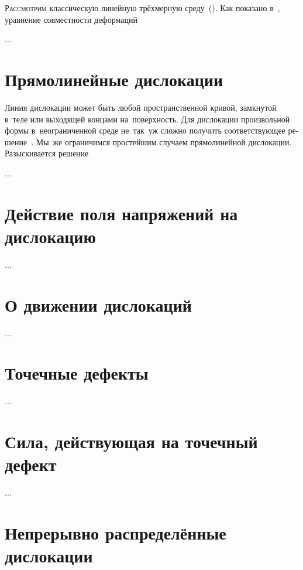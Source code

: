 \begin{otherlanguage}{russian}

\lettrine[lines=2, findent=2pt, nindent=0pt]{Р}{ассмотрим} классическую линейную трёхмерную среду~(). Как показано в~, уравнение совместности деформаций

...



\section{Прямолинейные дислокации}

Линия дислокации может быть любой пространственной кривой, замкнутой в~теле или выходящей концами на~поверхность. Для дислокации произвольной формы в~неограниченной среде не~так~уж сложно получить соответствующее решение~\cite{eshelby-theoryofdislocations}. Мы~же ограничимся простейшим случаем прямо\-линей\-ной дислокации. Разыскивается решение

...



\section{Действие поля напряжений на дислокацию}

...



\section{О движении дислокаций}

...



\section{Точечные дефекты}

...



\section{Сила, действующая на точечный дефект}

...



\section{Непрерывно распределённые дислокации}


\end{otherlanguage}

